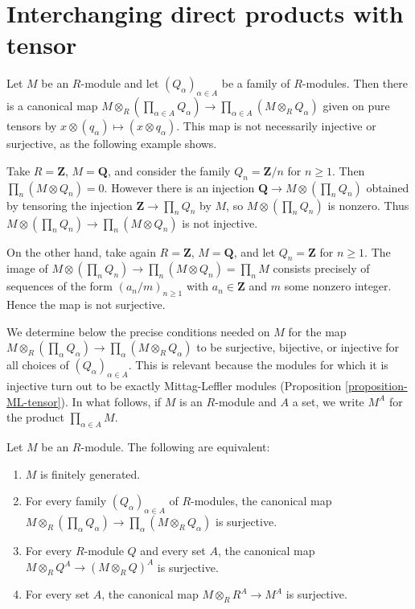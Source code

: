 \section{Interchanging direct products with tensor}
\label{section-products-tensor}

\noindent
Let $M$ be an $R$-module and let $(Q_{\alpha})_{\alpha \in A}$ be a family of
$R$-modules.  Then there is a canonical map $M \otimes_R \left( \prod_{\alpha
\in A} Q_{\alpha} \right) \to \prod_{\alpha \in A} ( M \otimes_R
Q_{\alpha})$ given on pure tensors by $x \otimes (q_{\alpha}) \mapsto (x
\otimes q_{\alpha})$.  This map is not necessarily injective or surjective, as
the following example shows.

\begin{example}
\label{example-Q-not-ML}
Take $R = \mathbf{Z}$, $M = \mathbf{Q}$, and consider the family $Q_n =
\mathbf{Z}/n$ for $n \geq 1$.  Then $\prod_n (M \otimes Q_n) = 0$.  However
there is an injection $\mathbf{Q} \to M \otimes (\prod_n Q_n)$
obtained by tensoring the injection $\mathbf{Z} \to \prod_n Q_n$ by
$M$, so $M \otimes (\prod_n Q_n)$ is nonzero.  Thus $M \otimes (\prod_n
Q_n) \to \prod_n (M \otimes Q_n)$ is not injective.

\medskip\noindent
On the other hand, take again $R = \mathbf{Z}$, $M = \mathbf{Q}$, and let $Q_n
= \mathbf{Z}$ for $n \geq 1$.  The image of $M \otimes (\prod_n Q_n)
\to \prod_n (M \otimes Q_n) = \prod_n M$ consists precisely of
sequences of the form $(a_n/m)_{n \geq 1}$ with $a_n \in \mathbf{Z}$ and $m$
some nonzero integer.  Hence the map is not surjective.
\end{example}

\noindent
We determine below the precise conditions needed on $M$ for the map $M
\otimes_R \left( \prod_{\alpha} Q_{\alpha} \right) \to \prod_{\alpha}
(M \otimes_R Q_{\alpha})$ to be surjective, bijective, or injective for all
choices of $(Q_{\alpha})_{\alpha \in A}$.  This is relevant because the modules
for which it is injective turn out to be exactly Mittag-Leffler modules
(Proposition \ref{proposition-ML-tensor}).  In what follows, if $M$ is an
$R$-module and $A$ a set, we write $M^A$ for the product $\prod_{\alpha \in A}
M$.

\begin{proposition}
\label{proposition-fg-tensor}
Let $M$ be an $R$-module.  The following are equivalent:
\begin{enumerate}
\item $M$ is finitely generated.
\item For every family $(Q_{\alpha})_{\alpha \in A}$ of $R$-modules, the
canonical map $M \otimes_R \left( \prod_{\alpha} Q_{\alpha} \right)
\to \prod_{\alpha} (M \otimes_R Q_{\alpha})$ is surjective.
\item For every $R$-module $Q$ and every set $A$, the canonical map $M
\otimes_R Q^{A} \to (M \otimes_R Q)^{A}$ is surjective.
\item For every set $A$, the canonical map $M \otimes_R R^{A} \to
M^{A}$ is surjective.
\end{enumerate}
\end{proposition}

